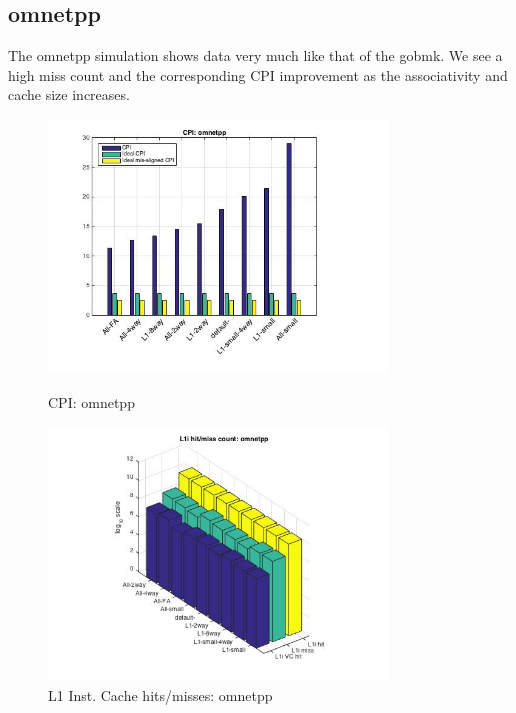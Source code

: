 \documentclass[11pt,titlepage]{article}
\begin{document}
    \subsection{omnetpp}
    The omnetpp simulation shows data very much like that of the gobmk. We see a high miss count and the corresponding CPI improvement as the associativity and cache size increases. 
    \begin{figure}[H]
      \centering
      \begin{minipage}{.45\textwidth}
      \includegraphics[width=9cm]{CPIomnetpp}
      \caption{CPI: omnetpp}
      \label{fig:CPIomnetpp}
      \end{minipage}
      \begin{minipage}{.45\textwidth}
            \centering
            \includegraphics[width=9cm]{L1IHM_omnetpp}
            \caption{L1 Inst. Cache hits/misses: omnetpp}
            \label{fig:L1IHM_omnetpp}
          \end{minipage}%
           \end{figure}
\end{document}
